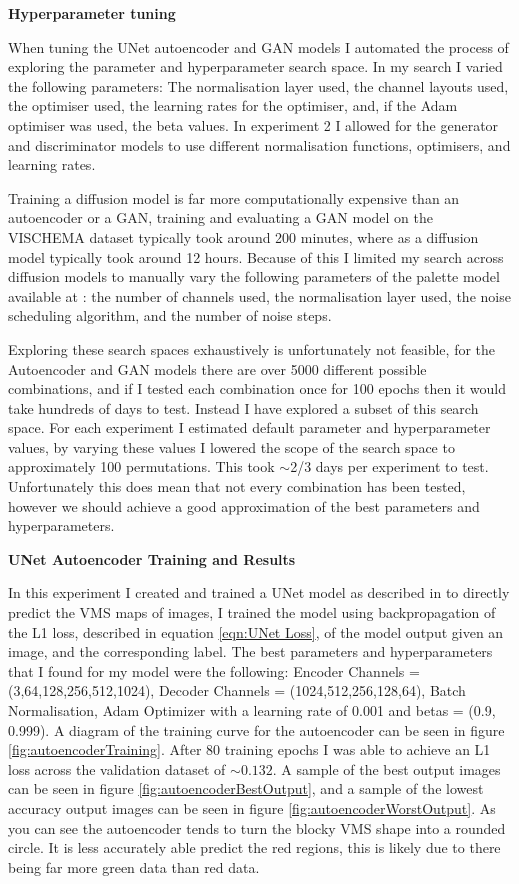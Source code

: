 \documentclass{UoYCSproject}
\begin{document}
\textbf{Hyperparameter tuning}

When tuning the UNet autoencoder and GAN models I automated the process of exploring the parameter and hyperparameter search space. In my search I varied the following parameters: The normalisation layer used, the channel layouts used, the optimiser used, the learning rates for the optimiser, and, if the Adam optimiser was used, the beta values. In experiment 2 I allowed for the generator and discriminator models to use different normalisation functions, optimisers, and learning rates. 

Training a diffusion model is far more computationally expensive than an autoencoder or a GAN, training and evaluating a GAN model on the VISCHEMA dataset typically took around 200 minutes, where as a diffusion model typically took around 12 hours. 
Because of this I limited my search across diffusion models to manually vary the following parameters of the palette model available at \cite{JanspiryPalette}: the number of channels used, the normalisation layer used, the noise scheduling algorithm, and the number of noise steps.

Exploring these search spaces exhaustively is unfortunately not feasible, for the Autoencoder and GAN models there are over 5000 different possible combinations, and if I tested each combination once for 100 epochs then it would take hundreds of days to test.
Instead I have explored a subset of this search space. For each experiment I estimated default parameter and hyperparameter values, by varying these values I lowered the scope of the search space to approximately 100 permutations. This took \(\sim\)2/3 days per experiment to test. Unfortunately this does mean that not every combination has been tested, however we should achieve a good approximation of the best parameters and hyperparameters.

\textbf{UNet Autoencoder Training and Results}

In this experiment I created and trained a UNet model as described in \cite{ronneberger2015unet} to directly predict the VMS maps of images, I trained the model using backpropagation of the L1 loss, described in equation \ref{eqn:UNet Loss}, of the model output given an image, and the corresponding label. The best parameters and hyperparameters that I found for my model were the following: Encoder Channels = (3,64,128,256,512,1024), Decoder Channels = (1024,512,256,128,64), Batch Normalisation, Adam Optimizer with a learning rate of 0.001 and betas = (0.9, 0.999). A diagram of the training curve for the autoencoder can be seen in figure \ref{fig:autoencoderTraining}. After 80 training epochs I was able to achieve an L1 loss across the validation dataset of \( \sim 0.132 \). A sample of the best output images can be seen in figure \ref{fig:autoencoderBestOutput}, and a sample of the lowest accuracy output images can be seen in figure \ref{fig:autoencoderWorstOutput}. As you can see the autoencoder tends to turn the blocky VMS shape into a rounded circle. It is less accurately able predict the red regions, this is likely due to there being far more green data than red data.
\end{document}
